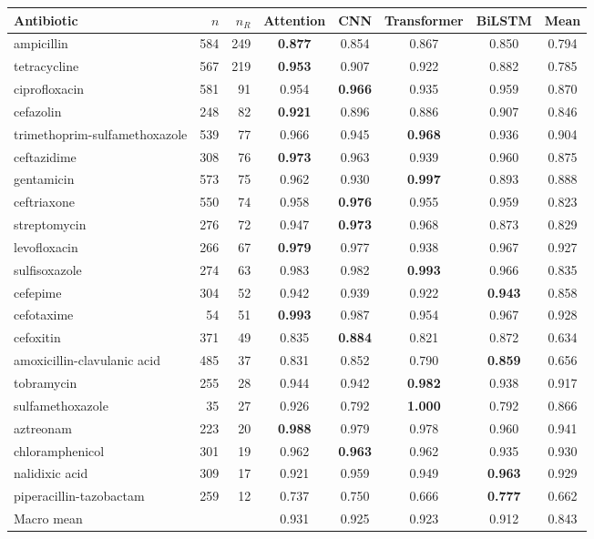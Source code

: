 \begin{tabular}{lrrccccc}
\toprule
Antibiotic & $n$ & $n_R$ & Attention & CNN & Transformer & BiLSTM & Mean \\
\midrule
ampicillin & 584 & 249 & \textbf{0.877} & 0.854 & 0.867 & 0.850 & 0.794 \\
tetracycline & 567 & 219 & \textbf{0.953} & 0.907 & 0.922 & 0.882 & 0.785 \\
ciprofloxacin & 581 & 91 & 0.954 & \textbf{0.966} & 0.935 & 0.959 & 0.870 \\
cefazolin & 248 & 82 & \textbf{0.921} & 0.896 & 0.886 & 0.907 & 0.846 \\
trimethoprim-sulfamethoxazole & 539 & 77 & 0.966 & 0.945 & \textbf{0.968} & 0.936 & 0.904 \\
ceftazidime & 308 & 76 & \textbf{0.973} & 0.963 & 0.939 & 0.960 & 0.875 \\
gentamicin & 573 & 75 & 0.962 & 0.930 & \textbf{0.997} & 0.893 & 0.888 \\
ceftriaxone & 550 & 74 & 0.958 & \textbf{0.976} & 0.955 & 0.959 & 0.823 \\
streptomycin & 276 & 72 & 0.947 & \textbf{0.973} & 0.968 & 0.873 & 0.829 \\
levofloxacin & 266 & 67 & \textbf{0.979} & 0.977 & 0.938 & 0.967 & 0.927 \\
sulfisoxazole & 274 & 63 & 0.983 & 0.982 & \textbf{0.993} & 0.966 & 0.835 \\
cefepime & 304 & 52 & 0.942 & 0.939 & 0.922 & \textbf{0.943} & 0.858 \\
cefotaxime & 54 & 51 & \textbf{0.993} & 0.987 & 0.954 & 0.967 & 0.928 \\
cefoxitin & 371 & 49 & 0.835 & \textbf{0.884} & 0.821 & 0.872 & 0.634 \\
amoxicillin-clavulanic acid & 485 & 37 & 0.831 & 0.852 & 0.790 & \textbf{0.859} & 0.656 \\
tobramycin & 255 & 28 & 0.944 & 0.942 & \textbf{0.982} & 0.938 & 0.917 \\
sulfamethoxazole & 35 & 27 & 0.926 & 0.792 & \textbf{1.000} & 0.792 & 0.866 \\
aztreonam & 223 & 20 & \textbf{0.988} & 0.979 & 0.978 & 0.960 & 0.941 \\
chloramphenicol & 301 & 19 & 0.962 & \textbf{0.963} & 0.962 & 0.935 & 0.930 \\
nalidixic acid & 309 & 17 & 0.921 & 0.959 & 0.949 & \textbf{0.963} & 0.929 \\
piperacillin-tazobactam & 259 & 12 & 0.737 & 0.750 & 0.666 & \textbf{0.777} & 0.662 \\
\midrule
Macro mean & & & 0.931 & 0.925 & 0.923 & 0.912 & 0.843 \\
\bottomrule
\end{tabular}
